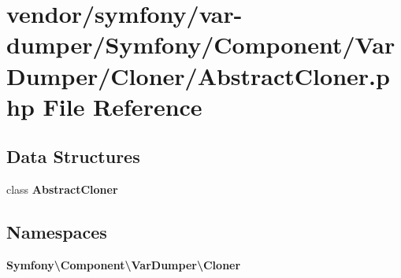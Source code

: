 \section{vendor/symfony/var-\/dumper/\+Symfony/\+Component/\+Var\+Dumper/\+Cloner/\+Abstract\+Cloner.php File Reference}
\label{_abstract_cloner_8php}
\subsection*{Data Structures}
\begin{DoxyCompactItemize}
\item 
class {\bf Abstract\+Cloner}
\end{DoxyCompactItemize}
\subsection*{Namespaces}
\begin{DoxyCompactItemize}
\item 
 {\bf Symfony\textbackslash{}\+Component\textbackslash{}\+Var\+Dumper\textbackslash{}\+Cloner}
\end{DoxyCompactItemize}
